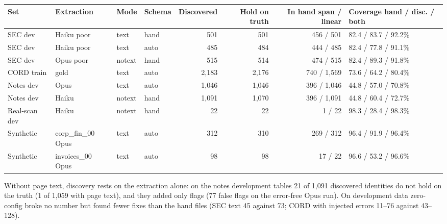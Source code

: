 \label{tab:discdev}
\begin{center}\footnotesize
\begin{tabular}{llllrrrl}
\toprule
Set & Extraction & Mode & Schema & Discovered & Hold on truth & In hand span / linear & Coverage hand / disc. / both \\
\midrule
SEC dev & Haiku poor & text & hand & 501 & 501 & 456 / 501 & 82.4 / 83.7 / 92.2\% \\
SEC dev & Haiku poor & text & auto & 485 & 484 & 444 / 485 & 82.4 / 77.8 / 91.1\% \\
SEC dev & Opus poor & notext & hand & 515 & 514 & 474 / 515 & 82.4 / 89.3 / 91.8\% \\
CORD train & gold & text & auto & 2,183 & 2,176 & 740 / 1,569 & 73.6 / 64.2 / 80.4\% \\
Notes dev & Opus & text & auto & 1,046 & 1,046 & 396 / 1,046 & 44.8 / 57.0 / 70.8\% \\
Notes dev & Haiku & notext & hand & 1,091 & 1,070 & 396 / 1,091 & 44.8 / 60.4 / 72.7\% \\
Real-scan dev & Haiku & notext & hand & 22 & 22 & 1 / 22 & 98.3 / 28.4 / 98.3\% \\
Synthetic & corp\_fin\_00 Opus & text & auto & 312 & 310 & 269 / 312 & 96.4 / 91.9 / 96.4\% \\
Synthetic & invoices\_00 Opus & text & auto & 98 & 98 & 17 / 22 & 96.6 / 53.2 / 96.6\% \\
\bottomrule
\end{tabular}
\end{center}
Without page text, discovery rests on the extraction alone: on the notes development tables 21 of 1,091 discovered identities do not hold on the truth (1 of 1,059 with page text), and they added only flags (77 false flags on the error-free Opus run). On development data zero-config broke no number but found fewer fixes than the hand files (SEC text 45 against 73; CORD with injected errors 11--76 against 43--128).

